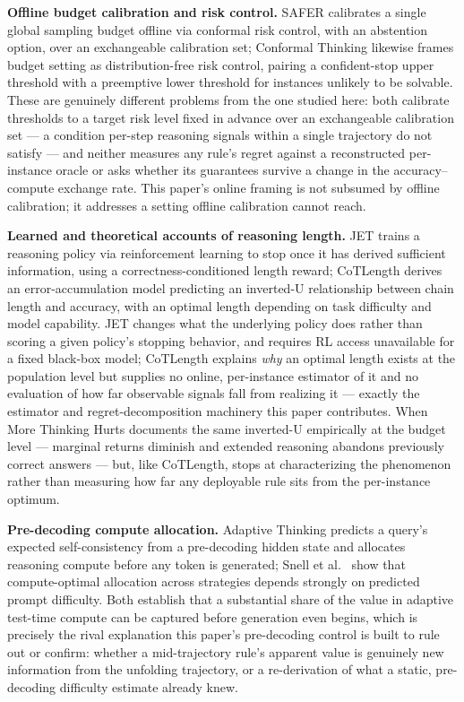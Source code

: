 \documentclass[11pt]{article}
\begin{document}
\textbf{Offline budget calibration and risk control.} SAFER \citep{SAFER2607} calibrates a single global sampling budget offline via conformal risk control, with an abstention option, over an exchangeable calibration set; Conformal Thinking \citep{ConformalThinking2602} likewise frames budget setting as distribution-free risk control, pairing a confident-stop upper threshold with a preemptive lower threshold for instances unlikely to be solvable. These are genuinely different problems from the one studied here: both calibrate thresholds to a target risk level fixed in advance over an exchangeable calibration set --- a condition per-step reasoning signals within a single trajectory do not satisfy --- and neither measures any rule's regret against a reconstructed per-instance oracle or asks whether its guarantees survive a change in the accuracy--compute exchange rate. This paper's online framing is not subsumed by offline calibration; it addresses a setting offline calibration cannot reach.

\textbf{Learned and theoretical accounts of reasoning length.} JET \citep{JET2607} trains a reasoning policy via reinforcement learning to stop once it has derived sufficient information, using a correctness-conditioned length reward; CoTLength \citep{CoTLength2607} derives an error-accumulation model predicting an inverted-U relationship between chain length and accuracy, with an optimal length depending on task difficulty and model capability. JET changes what the underlying policy does rather than scoring a given policy's stopping behavior, and requires RL access unavailable for a fixed black-box model; CoTLength explains \emph{why} an optimal length exists at the population level but supplies no online, per-instance estimator of it and no evaluation of how far observable signals fall from realizing it --- exactly the estimator and regret-decomposition machinery this paper contributes. When More Thinking Hurts \citep{MoreThinkingHurts2604} documents the same inverted-U empirically at the budget level --- marginal returns diminish and extended reasoning abandons previously correct answers --- but, like CoTLength, stops at characterizing the phenomenon rather than measuring how far any deployable rule sits from the per-instance optimum.

\textbf{Pre-decoding compute allocation.} Adaptive Thinking \citep{AdaptiveThinking2607} predicts a query's expected self-consistency from a pre-decoding hidden state and allocates reasoning compute before any token is generated; Snell et al.\ \citep{Snell2024} show that compute-optimal allocation across strategies depends strongly on predicted prompt difficulty. Both establish that a substantial share of the value in adaptive test-time compute can be captured before generation even begins, which is precisely the rival explanation this paper's pre-decoding control is built to rule out or confirm: whether a mid-trajectory rule's apparent value is genuinely new information from the unfolding trajectory, or a re-derivation of what a static, pre-decoding difficulty estimate already knew.
\end{document}
